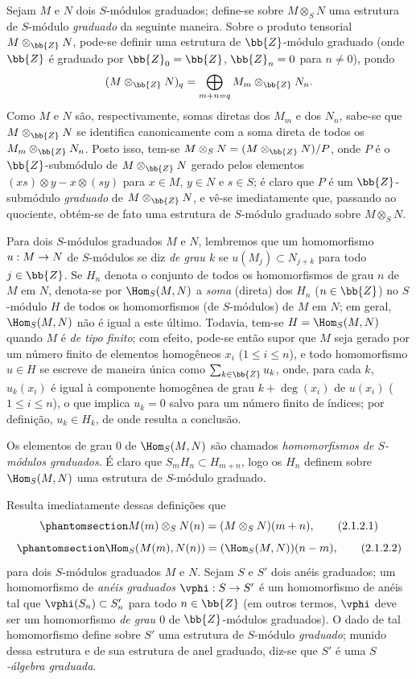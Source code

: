 \documentclass[oneside,10pt]{amsart}
\makeatletter
\renewcommand{\leq}{\leqslant}
\newcommand{\ega@arrow}[2]{\mathchoice{#1}{#2}{#2}{#2}}
\renewcommand{\to}{\ega@arrow{\longrightarrow}{\rightarrow}}
\newcommand{\oldpage}[2][]{\marginnote{\normalfont\footnotesize\textbf{#1}~|~#2}\ignorespaces}
\let\EGAOriginalLabel\label
\renewcommand{\label}[1]{\phantomsection\EGAOriginalLabel{#1}}
\makeatother
\begin{document}
\begin{env}[2.1.2]
\label{II.2.1.2}
Sejam $M$ e $N$ dois $S$-módulos graduados; define-se sobre $M\otimes_S N$ uma estrutura de $S$-módulo \emph{graduado} da seguinte maneira.
Sobre o produto tensorial $M\otimes_\bb{Z}N$, pode-se definir uma estrutura de $\bb{Z}$-módulo graduado (onde $\bb{Z}$ é graduado por $\bb{Z}_0=\bb{Z}$, $\bb{Z}_n=0$ para $n\neq0$), pondo
\[
  (M\otimes_\bb{Z}N)_q
  =\bigoplus_{m+n=q}M_m\otimes_\bb{Z}N_n.
\]
Como $M$ e $N$ são, respectivamente, somas diretas dos $M_m$ e dos $N_n$, sabe-se que $M\otimes_\bb{Z}N$ se identifica canonicamente com a soma direta de todos os $M_m\otimes_\bb{Z}N_n$.
Posto isso, tem-se $M\otimes_S N=(M\otimes_\bb{Z}N)/P$, onde $P$ é o $\bb{Z}$-submódulo de $M\otimes_\bb{Z}N$ gerado pelos elementos $(xs)\otimes y-x\otimes(sy)$ para $x\in M$, $y\in N$ e $s\in S$; é claro que $P$ é um $\bb{Z}$-submódulo \emph{graduado} de $M\otimes_\bb{Z}N$, e vê-se imediatamente que, passando ao quociente, obtém-se de fato uma estrutura de $S$-módulo graduado sobre $M\otimes_S N$.

Para dois $S$-módulos graduados $M$ e $N$, lembremos que um homomorfismo $u:M\to N$ de $S$-módulos se diz \emph{de grau $k$} se $u(M_j)\subset N_{j+k}$ para todo $j\in\bb{Z}$.
Se $H_n$ denota o conjunto de todos os homomorfismos de grau $n$ de $M$ em $N$, denota-se por $\Hom_S(M,N)$ a \emph{soma} (direta) dos $H_n$ ($n\in\bb{Z}$) no $S$-módulo $H$ de todos os homomorfismos (de $S$-módulos) de $M$ em $N$; em geral, $\Hom_S(M,N)$ não é igual a este último.
Todavia, tem-se $H=\Hom_S(M,N)$ quando $M$ é \emph{de tipo finito}; com efeito, pode-se então supor que $M$ seja gerado por um número finito de elementos homogêneos $x_i$ ($1\leq i\leq n$), e todo homomorfismo $u\in H$ se escreve de maneira única como $\sum_{k\in\bb{Z}}u_k$, onde, para cada $k$, $u_k(x_i)$ é igual à componente homogênea de grau $k+\deg(x_i)$ de $u(x_i)$ ($1\leq i\leq n$), o que implica $u_k=0$ salvo para um número finito de índices; por definição, $u_k\in H_k$, de onde resulta a conclusão.

Os elementos de grau $0$ de $\Hom_S(M,N)$ são chamados \emph{homomorfismos de $S$-módulos graduados}.
É claro que $S_mH_n\subset H_{m+n}$, logo os $H_n$ definem sobre $\Hom_S(M,N)$ uma estrutura de $S$-módulo graduado.

Resulta imediatamente dessas definições que
\[
\label{II.2.1.2.1}
  M(m)\otimes_S N(n)=(M\otimes_S N)(m+n),
\tag{2.1.2.1}
\]
\[
\label{II.2.1.2.2}
  \Hom_S(M(m),N(n))=(\Hom_S(M,N))(n-m),
\tag{2.1.2.2}
\]
para dois $S$-módulos graduados $M$ e $N$.
\oldpage[II]{21}
Sejam $S$ e $S'$ dois anéis graduados; um homomorfismo de \emph{anéis graduados $\vphi:S\to S'$} é um homomorfismo de anéis tal que $\vphi(S_n)\subset S_n'$ para todo $n\in\bb{Z}$ (em outros termos, $\vphi$ deve ser um homomorfismo \emph{de grau $0$} de $\bb{Z}$-módulos graduados).
O dado de tal homomorfismo define sobre $S'$ uma estrutura de $S$-módulo \emph{graduado}; munido dessa estrutura e de sua estrutura de anel graduado, diz-se que $S'$ é uma \emph{$S$-álgebra graduada}.


\end{env}
\end{document}
